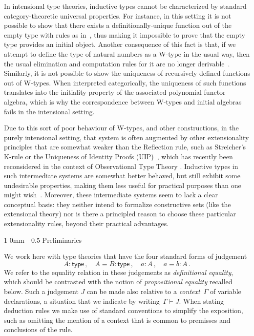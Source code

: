 \documentclass[10pt,a4paper,oneside,reqno]{amsart}
\makeatletter
\numberwithin{equation}{section}
\renewcommand{\section}{\@startsection
  {section}%
   {1}%
  {0mm}%
   {-\baselineskip}%
  {0.5\baselineskip}%
   {\Large\bfseries}}%
\theoremstyle{mythm}
\theoremstyle{mydef}
\theoremstyle{myrmk}
\newcommand{\deq}{\equiv}
\newcommand{\co}{\colon}
\newcommand{\type}{\mathsf{type}}
\makeatother
\begin{document}
\vspace{3cm}

In intensional type theories, inductive types cannot be characterized by standard category-theoretic
universal properties. For instance, in this setting it is not possible to show that there exists a 
definitionally-unique function out of the empty type with rules as in~\cite[Section~5.2]{NordstromB:marltt}, thus making it impossible to prove that the empty type provides an initial object. 
Another consequence of this fact is that, if we attempt to define the type of 
natural numbers as a W-type in the usual way, then 
the usual elimination and computation rules for it are no longer derivable~\cite{DybjerP:repids}. Similarly, it is not possible to show the uniqueness of recursively-defined functions out of W-types. When interpreted categorically, the uniqueness of such functions translates into the initiality property of the associated polynomial functor algebra, which is why the correspondence between W-types and initial algebras fails in the intensional setting.

Due to this sort of poor behaviour of W-types, and other constructions, in the purely intensional setting, that system is often augmented by other extensionality principles that are somewhat weaker than the Reflection rule, such as Streicher's K-rule  or the Uniqueness of Identity Proofs (UIP)~\cite{StreicherT:invitt}, which has recently been reconsidered
in the context of Observational Type Theory \cite{AltenkirchT:obsen}.  Inductive types in such intermediate systems are somewhat better behaved, but still exhibit some undesirable properties, making them less useful for practical purposes than one might wish~\cite{McBrideC:wtygnb}.  Moreover, these intermediate systems seem to lack a clear conceptual basis:  they neither intend to formalize constructive sets (like the extensional theory) nor is there a principled reason to choose these particular extensionality rules, beyond their practical advantages.  

\newpage

\section{Preliminaries}
\label{section:prelim}



We work here with type theories that have the four standard forms of judgement
\[
A \co \type \, , \quad A \deq B \co \type \, , \quad   a \co A \, , \quad a \deq b \co A \, . 
\]
We refer to the equality relation in these judgements as \emph{definitional equality}, 
which should be contrasted with the notion of \emph{propositional equality}
recalled below. 
Such a judgement $J$ can be made also relative to a \emph{context}~$\Gamma$ of variable declarations, a situation that we indicate by writing~$\Gamma \vdash J$. When stating deduction
rules we make use of standard conventions to simplify the exposition, such as omitting the mention
of a context that is common to premisses and conclusions of the rule.
\end{document}
